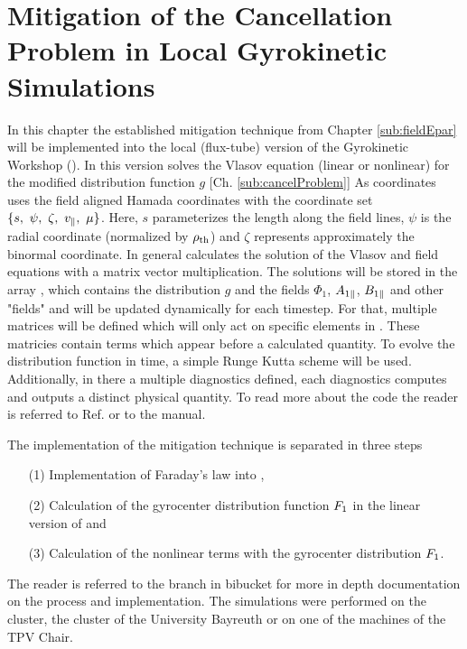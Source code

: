 \chapter{Mitigation of the Cancellation Problem in Local Gyrokinetic Simulations}
\label{chap:methods}

\thispagestyle{empty}
\newpage

In this chapter the established mitigation technique from Chapter \ref{sub:fieldEpar} will be implemented into the local (flux-tube) version of the Gyrokinetic Workshop ({\gkw}). In this version {\gkw} solves the Vlasov equation (linear or nonlinear) for the modified distribution function $g$ [Ch. \ref{sub:cancelProblem}] As coordinates {\gkw} uses the field aligned Hamada coordinates\cite{Hamada1962} with the coordinate set $\{s,~\psi,~\zeta,~v_\parallel,~\mu\}$. Here, $s$ parameterizes the length along the field lines, $\psi$ is the radial coordinate (normalized by $\rho_{\mathrm{th}}$) and $\zeta$ represents approximately the binormal coordinate. In general {\gkw} calculates the solution of the Vlasov and field equations with a matrix vector multiplication. The solutions will be stored in the array , which contains the distribution $g$ and the fields $\Phi_1$, $A_{1\parallel}$, $B_{1\parallel}$ and other "fields" and will be updated dynamically for each timestep. For that, multiple matrices will be defined which will only act on specific elements in . These matricies contain terms which appear before a calculated quantity. To evolve the distribution function in time, a simple Runge Kutta scheme will be used. Additionally, in {\gkw} there a multiple diagnostics defined, each diagnostics computes and outputs a distinct physical quantity. \cite{GKWManual} To read more about the code {\gkw} the reader is referred to Ref.  or to the manual\cite{GKWManual}.
\bigskip

The implementation of the mitigation technique is separated in three steps
\begin{itemize}
    \item[(1)] Implementation of Faraday's law into {\gkw},
    \item[(2)] Calculation of the gyrocenter distribution function $F_1$ in the linear version of {\gkw} and
    \item[(3)] Calculation of the nonlinear terms with the gyrocenter distribution $F_1$.
\end{itemize}

The reader is referred to the branch in bibucket\cite{FeatureEparBitbucket} for more in depth documentation on the process and implementation. The simulations were performed on the \cite{emil} cluster, the \cite{festus} cluster of the University Bayreuth or on one of the  machines of the TPV Chair.

\newpage